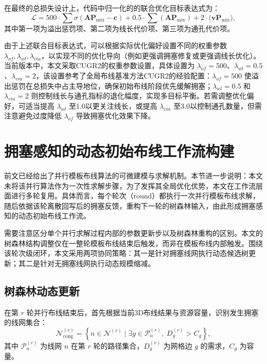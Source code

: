 在最终的总损失设计上，代码中归一化的的联合优化目标表达式为：
\begin{equation}
    \mathcal{L}=500\cdot \sum\sigma(\mathbf{A}\mathbf{P}_{\mathrm{mix}}-\mathbf{c}) + 0.5\cdot\sum(\mathbf{A}\mathbf{P}_{\mathrm{mix}}) + 2\cdot\big(\mathbf{v}\mathbf{P}_{\mathrm{mix}}\big),
\end{equation}
其中第一项为溢出惩罚项、第二项为线长代价项、第三项为通孔代价项。


由于上述联合目标表达式，可以根据实际优化偏好设置不同的权重参数 $\lambda_{of},\lambda_{wl},\lambda_{via}$，以实现不同的优化导向（例如更强调拥塞修复或更强调线长优化）。当前版本中，本文采取CUGR2的权重参数设置，具体设置为 $\lambda_{of}=500$、$\lambda_{wl}=0.5$、$\lambda_{via}=2$，该设置参考了全局布线基准方法CUGR2的经验配置：$\lambda_{of}=500$ 使溢出惩罚在总损失中占主导地位，确保初始布线阶段优先缓解拥塞；$\lambda_{wl}=0.5$ 和 $\lambda_{via}=2$ 则控制线长与通孔指标的退化幅度，实现多目标平衡。若需调整优化偏好，可适当提高 $\lambda_{wl}$ 至1.0以更关注线长，或提高 $\lambda_{via}$ 至3.0以控制通孔数量，但需注意避免过度降低 $\lambda_{of}$ 导致拥塞优化效果下降。


\section{拥塞感知的动态初始布线工作流构建}
\label{sec:chap3-dynamic}

前文已经给出了并行模板布线算法的可微建模与求解机制。本节进一步说明：本文未将该并行算法作为一次性求解步骤，为了发挥其全局优化优势，本文在工作流层面进行多轮复用。具体而言，每个轮次（round）都执行一次并行模板布线求解，随后依据该轮离散回写后的拥塞反馈，重构下一轮的树森林输入，由此形成拥塞感知的动态初始布线工作流。

需要注意区分单个并行求解过程内部的参数更新步以及树森林重构的区别。本文的树森林结构调整仅在一整轮模板布线结束后触发，而非在模板布线内部触发。围绕该轮次级闭环，本文采用两项协同策略：其一是针对拥塞线网执行动态候选树更新；其二是针对无拥塞线网执行动态规模缩减。

\subsection{树森林动态更新}

在第 $r$ 轮并行布线结束后，首先根据当前3D布线结果与资源容量，识别发生拥塞的线网集合：
\begin{equation}
    \mathcal{N}_{\mathrm{cong}}^{(r)}=\left\{n\in\mathcal{N}^{(r)}\mid\exists g\in\mathcal{P}_n^{(r)},\;D_g^{(r)}>C_g\right\},
\end{equation}
其中 $\mathcal{P}_n^{(r)}$ 为线网 $n$ 在第 $r$ 轮的路径集合，$D_g^{(r)}$ 为网格边 $g$ 的需求，$C_g$ 为容量。


